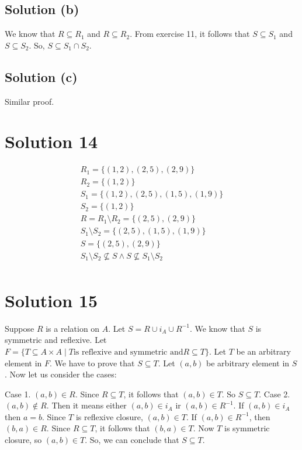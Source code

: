 \documentclass{article}
\begin{document}
\subsection{Solution (b)}
We know that $R \subseteq R_1$ and $R \subseteq R_2$. From exercise
11, it follows that $S \subseteq S_1$ and $S \subseteq S_2$. So, $S
\subseteq S_1 \cap S_2$.

\subsection{Solution (c)}
Similar proof.

\section{Solution 14}
\begin{align*}
  R_1 = \{(1,2),(2,5),(2,9)\} \\
  R_2 = \{(1,2)\} \\
  S_1 = \{(1,2), (2,5), (1,5), (1,9)\} \\
  S_2 = \{(1,2)\} \\
  R = R_1 \setminus R_2 = \{(2,5),(2,9)\} \\
  S_1 \setminus S_2 = \{(2,5), (1,5), (1,9)\} \\
  S = \{(2,5), (2,9)\} \\
  S_1 \setminus S_2 \nsubseteq S \land S \nsubseteq S_1 \setminus S_2 \\
\end{align*}

\section{Solution 15}
Suppose $R$ is a relation on $A$. Let $S = R \cup i_A \cup R^{-1}$. We
know that $S$ is symmetric and reflexive. Let $F = \{ T \subseteq A
\times A \mid T \text{is reflexive and symmetric and} R \subseteq
T\}$. Let $T$ be an arbitrary element in $F$. We have to prove that $S
\subseteq T$. Let $(a,b)$ be arbitrary element in $S$. Now let us
consider the cases:

Case 1. $(a,b) \in R$. Since $R \subseteq T$, it follows that
$(a,b)\in T$. So $S \subseteq T$.
Case 2. $(a,b) \notin R$. Then it means either $(a,b) \in i_A$ ir
$(a,b) \in R^{-1}$. If $(a,b) \in i_A$ then $a = b$. Since $T$ is
reflexive closure, $(a,b) \in T$. If $(a,b) \in R^{-1}$, then $(b,a)
\in R$. Since $R \subseteq T$, it follows that $(b,a) \in T$. Now $T$
is symmetric closure, so $(a,b) \in T$. So, we can conclude that $S
\subseteq T$.
\end{document}
